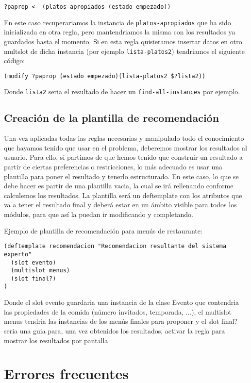 \documentclass[11pt,svgnames]{scrbook}
\begin{document}
	\texttt{?paprop <- (platos-apropiados (estado empezado))}

En este caso recuperariamos la instancia de \texttt{platos-apropiados} que ha sido inicializada en otra regla, pero mantendriamos la misma con los resultados ya guardados hasta el momento.
Si en esta regla quisieramos insertar datos en otro multslot de dicha instancia (por ejemplo \texttt{lista-platos2}) tendriamos el siguiente código:

	\texttt{(modify ?paprop (estado empezado)(lista-platos2 \$?lista2))}

Donde \texttt{lista2} seria el resultado de hacer un \texttt{find-all-instances} por ejemplo.

\section{Creación de la plantilla de recomendación}

Una vez aplicadas todas las reglas necesarias y manipulado todo el conocimiento que hayamos tenido que usar en el problema, deberemos mostrar los resultados al usuario. Para ello, si partimos de que hemos tenido que construir un resultado a partir de ciertas preferencias o restricciones, lo más adecuado es usar una plantilla para poner el resultado y tenerlo estructurado. En este caso, lo que se debe hacer es partir de una plantilla vacia, la cual se irá rellenando conforme calculemos los resultados. La plantilla será un deftemplate con los atributos que va a tener el resultado final y deberá estar en un ámbito visible para todos los módulos, para que así la puedan ir modificando y completando.

Ejemplo de plantilla de recomendación para menús de restaurante:

\begin{verbatim}
(deftemplate recomendacion "Recomendacion resultante del sistema experto"
  (slot evento)
  (multislot menus)
  (slot final?)
)\end{verbatim}

Donde el slot evento guardaria una instancia de la clase Evento que contendria las propiedades de la comida (número invitados, temporada, ...), el multislot menus tendria las instancias de los menús finales para proponer y el slot final? seria una guia para, una vez obtenidos los resultados, activar la regla para mostrar los resultados por pantalla

\chapter{Errores frecuentes}
\end{document}
